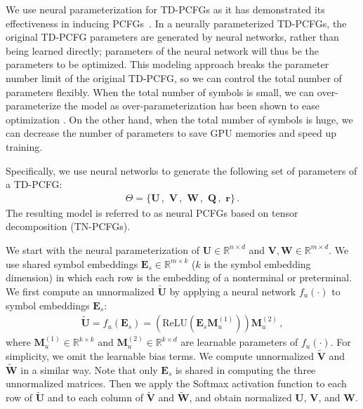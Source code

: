 \documentclass[11pt]{article}
\begin{document}
We use neural parameterization for TD-PCFGs as it has demonstrated its effectiveness in inducing PCFGs~\citep{kim-etal-2019-compound}.
In a neurally parameterized TD-PCFGs,
the original TD-PCFG parameters are generated by neural networks,
rather than being learned directly;
parameters of the neural network will thus be the parameters to be optimized.
This modeling approach breaks the parameter number limit of the original TD-PCFG, so we can control the total number of parameters flexibly. When the total number of symbols is small, we can over-parameterize the model as over-parameterization has been shown to ease optimization \cite{DBLP:conf/icml/AroraCH18, DBLP:conf/nips/XuHM18, DBLP:conf/iclr/DuZPS19}. On the other hand, when the total number of symbols is huge, we can decrease the number of parameters to save GPU memories and speed up training. 


Specifically, we use neural networks to generate the following set of parameters of a TD-PCFG:
\begin{align*}
\Theta = \{
\mathbf{U}\,,\,\, \mathbf{V}\,,\,\, \mathbf{W}\,,\,\,
\mathbf{Q}\,,\,\, \mathbf{r}
\}\,.
\end{align*}
The resulting model is referred to as neural PCFGs based on tensor decomposition (TN-PCFGs).

We start with the neural parameterization of $\mathbf{U}\in\mathbb{R}^{n\times d}$ and $\mathbf{V}, \mathbf{W}\in\mathbb{R}^{m\times d}$.
We use shared symbol embeddings $\mathbf{E}_s\in\mathbb{R}^{m\times k}$ ($k$ is the symbol embedding dimension) in which each row is the embedding of a nonterminal or preterminal.
We first compute an unnormalized $\tilde{\mathbf{U}}$ by applying a neural network $f_{u}(\cdot)$ to symbol embeddings $\mathbf{E}_s$:
\begin{align*}
\tilde{\mathbf{U}} = f_u(\mathbf{E}_s)= \left(\text{ReLU}\left(\mathbf{E}_s \mathbf{M}_{u}^{(1)}\right)\right) \mathbf{M}_{u}^{(2)}\,,
\end{align*}
where $\mathbf{M}_{u}^{(1)}\in\mathbb{R}^{k \times k}$ and $\mathbf{M}_{u}^{(2)}\in\mathbb{R}^{k \times d}$ are learnable parameters of $f_{u}(\cdot)$. For simplicity, we omit the learnable bias terms.
We compute unnormalized $\tilde{\mathbf{V}}$ and $\tilde{\mathbf{W}}$ in a similar way.
Note that only $\mathbf{E}_s$ is shared in computing the three unnormalized matrices.
Then we apply the Softmax activation function to each row of $\tilde{\mathbf{U}}$ and to each column of $\tilde{\mathbf{V}}$ and $\tilde{\mathbf{W}}$,
and obtain normalized $\mathbf{U}$, $\mathbf{V}$, and $\mathbf{W}$.
\end{document}

